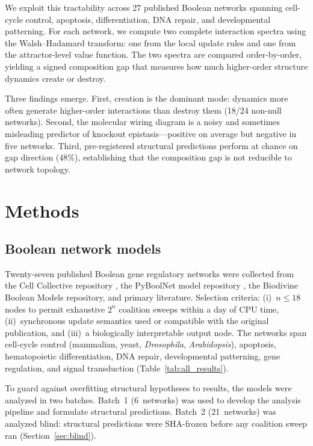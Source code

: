 \documentclass[10pt]{article}
\begin{document}
We exploit this tractability across 27 published Boolean networks
spanning cell-cycle control, apoptosis, differentiation, DNA repair,
and developmental patterning. For each network, we compute two
complete interaction spectra using the Walsh--Hadamard transform: one
from the local update rules and one from the attractor-level value
function. The two spectra are compared order-by-order, yielding a
signed composition gap that measures how much higher-order structure
dynamics create or destroy.

Three findings emerge. First, creation is the dominant mode: dynamics
more often generate higher-order interactions than destroy them (18/24
non-null networks). Second, the molecular wiring diagram is a noisy
and sometimes misleading predictor of knockout epistasis---positive on
average but negative in five networks. Third, pre-registered
structural predictions perform at chance on gap direction (48\%),
establishing that the composition gap is not reducible to network
topology.


\section{Methods}
\label{sec:methods}

\subsection{Boolean network models}
\label{sec:models}

Twenty-seven published Boolean gene regulatory networks were collected
from the Cell Collective repository \citep{helikar2012cell}, the
PyBoolNet model repository \citep{klarner2017pyboolnet}, the Biodivine
Boolean Models repository, and primary literature. Selection criteria:
(i)~$n \leq 18$ nodes to permit exhaustive $2^n$ coalition sweeps
within a day of CPU time, (ii)~synchronous update semantics used or
compatible with the original publication, and (iii)~a biologically
interpretable output node. The networks span cell-cycle control
(mammalian, yeast, \emph{Drosophila}, \emph{Arabidopsis}), apoptosis,
hematopoietic differentiation, DNA repair, developmental patterning,
gene regulation, and signal transduction (Table~\ref{tab:all_results}).

To guard against overfitting structural hypotheses to results, the
models were analyzed in two batches. Batch~1 (6~networks) was used to
develop the analysis pipeline and formulate structural predictions.
Batch~2 (21~networks) was analyzed blind: structural predictions were
SHA-frozen before any coalition sweep ran
(Section~\ref{sec:blind}).
\end{document}
